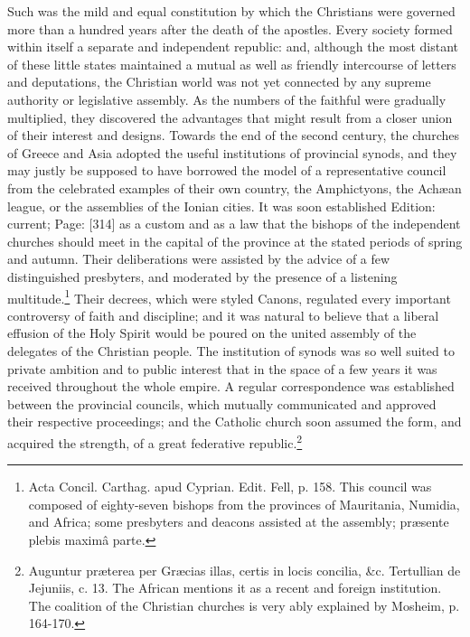 Such was the mild and equal constitution by which the Christians were governed more than a hundred years after the death of the apostles. Every society formed within itself a separate and independent republic: and, although the most distant of these little states maintained a mutual as well as friendly intercourse of letters and deputations, the Christian world was not yet connected by any supreme authority or legislative assembly. As the numbers of the faithful were gradually multiplied, they discovered the advantages that might result from a closer union of their interest and designs. Towards the end of the second century, the churches of Greece and Asia adopted the useful institutions of provincial synods, and they may justly be supposed to have borrowed the model of a representative council from the celebrated examples of their own country, the Amphictyons, the Achæan league, or the assemblies of the Ionian cities. It was soon established Edition: current; Page: [314] as a custom and as a law that the bishops of the independent churches should meet in the capital of the province at the stated periods of spring and autumn. Their deliberations were assisted by the advice of a few distinguished presbyters, and moderated by the presence of a listening multitude.\footnote{Acta Concil. Carthag. apud Cyprian. Edit. Fell, p. 158. This council was composed of eighty-seven bishops from the provinces of Mauritania, Numidia, and Africa; some presbyters and deacons assisted at the assembly; præsente plebis maximâ parte.} Their decrees, which were styled Canons, regulated every important controversy of faith and discipline; and it was natural to believe that a liberal effusion of the Holy Spirit would be poured on the united assembly of the delegates of the Christian people. The institution of synods was so well suited to private ambition and to public interest that in the space of a few years it was received throughout the whole empire. A regular correspondence was established between the provincial councils, which mutually communicated and approved their respective proceedings; and the Catholic church soon assumed the form, and acquired the strength, of a great federative republic.\footnote{Auguntur præterea per Græcias illas, certis in locis concilia, \&c. Tertullian de Jejuniis, c. 13. The African mentions it as a recent and foreign institution. The coalition of the Christian churches is very ably explained by Mosheim, p. 164-170.}


